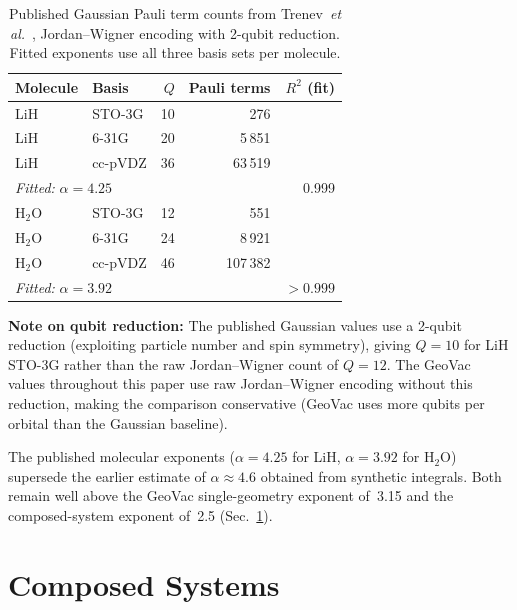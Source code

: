 \documentclass[aps,pra,twocolumn,superscriptaddress,longbibliography]{revtex4-2}
\begin{document}
\begin{table}[t]
\caption{Published Gaussian Pauli term counts from
Trenev~\textit{et al.}~\cite{trenev2025}, Jordan--Wigner encoding with
2-qubit reduction.  Fitted exponents use all three basis sets per
molecule.}
\label{tab:gaussian_published}
\begin{ruledtabular}
\begin{tabular}{llrrr}
Molecule & Basis & $Q$ & Pauli terms & $R^2$ (fit) \\
\hline
LiH & STO-3G   & 10 &       276 & \\
LiH & 6-31G    & 20 &     5\,851 & \\
LiH & cc-pVDZ  & 36 &    63\,519 & \\
\multicolumn{2}{l}{\textit{Fitted:} $\alpha = 4.25$} & & & 0.999 \\
\hline
H$_2$O & STO-3G   & 12 &       551 & \\
H$_2$O & 6-31G    & 24 &     8\,921 & \\
H$_2$O & cc-pVDZ  & 46 &   107\,382 & \\
\multicolumn{2}{l}{\textit{Fitted:} $\alpha = 3.92$} & & & $>0.999$ \\
\end{tabular}
\end{ruledtabular}
\end{table}

\noindent
\textbf{Note on qubit reduction:} The published Gaussian values use a
2-qubit reduction (exploiting particle number and spin symmetry),
giving $Q = 10$ for LiH STO-3G rather than the raw Jordan--Wigner count
of $Q = 12$.  The GeoVac values throughout this paper use raw
Jordan--Wigner encoding without this reduction, making the comparison
conservative (GeoVac uses more qubits per orbital than the Gaussian
baseline).

The published molecular exponents ($\alpha = 4.25$ for LiH,
$\alpha = 3.92$ for H$_2$O) supersede the earlier estimate of
$\alpha \approx 4.6$ obtained from synthetic integrals.  Both remain
well above the GeoVac single-geometry exponent of~3.15 and the
composed-system exponent of~2.5 (Sec.~\ref{sec:composed}).


\section{Composed Systems}
\label{sec:composed}
\end{document}
